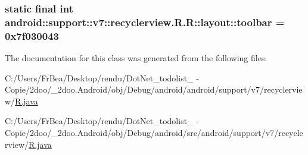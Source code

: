 \hypertarget{classandroid_1_1support_1_1v7_1_1recyclerview_1_1_r_1_1layout_93f3134032d4c880f87190193d868032}{
\subsubsection[{toolbar}]{\setlength{\rightskip}{0pt plus 5cm}static final int android::support::v7::recyclerview.R.R::layout::toolbar = 0x7f030043}}
\label{classandroid_1_1support_1_1v7_1_1recyclerview_1_1_r_1_1layout_93f3134032d4c880f87190193d868032}




The documentation for this class was generated from the following files:\begin{CompactItemize}
\item 
C:/Users/FrBea/Desktop/rendu/DotNet\_\-todolist\_ - Copie/2doo/\_\-2doo.Android/obj/Debug/android/android/support/v7/recyclerview/\hyperlink{android_2support_2v7_2recyclerview_2_r_8java}{R.java}\item 
C:/Users/FrBea/Desktop/rendu/DotNet\_\-todolist\_ - Copie/2doo/\_\-2doo.Android/obj/Debug/android/src/android/support/v7/recyclerview/\hyperlink{src_2android_2support_2v7_2recyclerview_2_r_8java}{R.java}\end{CompactItemize}
